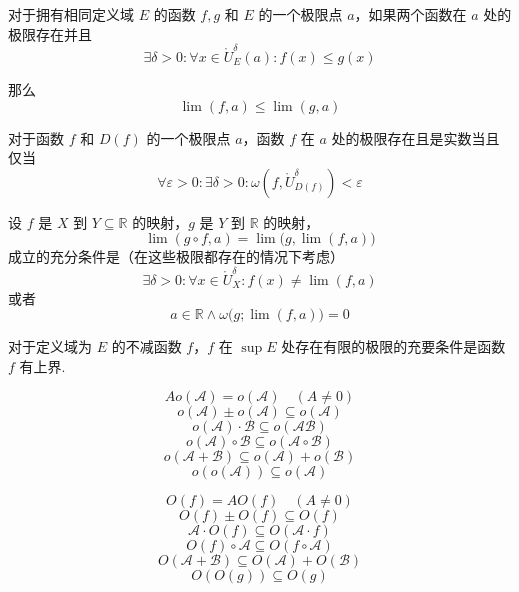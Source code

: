 \begin{theorem}
    对于拥有相同定义域 $E$ 的函数 $f,g$ 和 $E$ 的一个极限点 $a$，如果两个函数在 $a$ 处的极限存在并且
    \[\exists \delta > 0: \forall x \in \mathring{U}_E^\delta(a): f(x) \leqslant g(x)\]

    那么
    \[\lim(f,a) \leqslant \lim(g,a)\]
\end{theorem}\vspace{9pt}

\begin{theorem}
    对于函数 $f$ 和 $D(f)$ 的一个极限点 $a$，函数 $f$ 在 $a$ 处的极限存在且是实数当且仅当
    \[\forall \varepsilon > 0: \exists \delta > 0: \omega(f,\mathring{U}_{D(f)}^\delta) < \varepsilon\]
\end{theorem}\vspace{9pt}

\begin{theorem}
    设 $f$ 是 $X$ 到 $Y \subseteq \mathbb{R}$ 的映射，$g$ 是 $Y$ 到 $\mathbb{R}$ 的映射，
    \[\lim(g \circ f,a) = \lim\bigl(g, \lim(f,a)\bigr)\]
    成立的充分条件是（在这些极限都存在的情况下考虑）
    \[\exists \delta > 0: \forall x \in \mathring{U}_X^\delta: f(x) \neq \lim(f,a)\]
    或者
    \[a \in \mathbb{R} \wedge \omega\bigl(g;\lim(f,a)\bigr) = 0\]
\end{theorem}\vspace{9pt}

\begin{theorem}
    对于定义域为 $E$ 的不减函数 $f$，$f$ 在 $\sup E$ 处存在有限的极限的充要条件是函数 $f$ 有上界.
\end{theorem}\vspace{9pt}

\begin{theorem}
    \[Ao(\mathcal{A}) = o(\mathcal{A}) \quad (A \neq 0) \tag{1}\]
    \[o(\mathcal{A}) \pm o(\mathcal{A}) \subseteq o(\mathcal{A}) \tag{2}\]
    \[o(\mathcal{A}) \cdot \mathcal{B} \subseteq o(\mathcal{AB}) \tag{3}\]
    \[o(\mathcal{A}) \circ \mathcal{B} \subseteq o(\mathcal{A} \circ \mathcal{B}) \tag{4}\]
    \[o(\mathcal{A} + \mathcal{B}) \subseteq o(\mathcal{A}) + o(\mathcal{B}) \tag{5}\]
    \[o(o(\mathcal{A})) \subseteq o(\mathcal{A}) \tag{6}\]
\end{theorem}\vspace{9pt}

\begin{theorem}
    \[O(f) = AO(f) \quad (A \neq 0) \tag{1}\]
    \[O(f) \pm O(f) \subseteq O(f) \tag{2}\]
    \[\mathcal{A} \cdot O(f) \subseteq O(\mathcal{A} \cdot f) \tag{3}\]
    \[O(f) \circ \mathcal{A} \subseteq O(f \circ \mathcal{A}) \tag{4}\]
    \[O(\mathcal{A} + \mathcal{B}) \subseteq O(\mathcal{A}) + O(\mathcal{B}) \tag{5}\]
    \[O(O(g)) \subseteq O(g) \tag{6}\]
\end{theorem}

